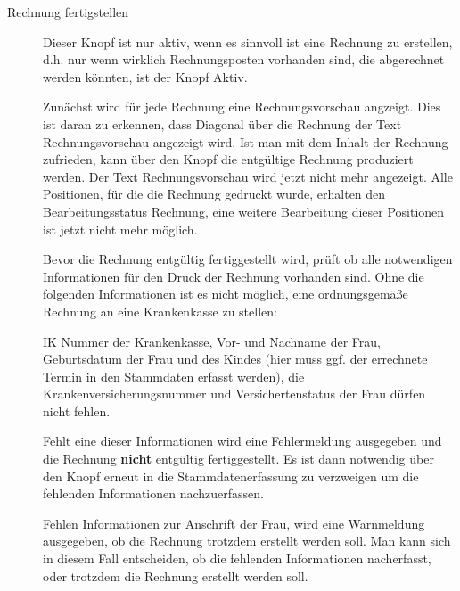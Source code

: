 \begin{description}
\item[Rechnung fertigstellen]
Dieser Knopf ist nur aktiv, wenn es sinnvoll ist eine Rechnung zu erstellen,
d.h. nur wenn wirklich Rechnungsposten vorhanden sind, die abgerechnet
werden könnten, ist der Knopf Aktiv.

Zunächst wird für jede Rechnung eine Rechnungsvorschau angzeigt. Dies
ist daran zu erkennen, dass Diagonal über die Rechnung der Text
Rechnungsvorschau angezeigt wird. Ist man mit dem Inhalt der Rechnung
zufrieden, kann über den Knopf  die
entgültige Rechnung produziert werden. Der Text Rechnungsvorschau
wird jetzt nicht mehr angezeigt. Alle Positionen, für die die
Rechnung gedruckt wurde, erhalten den Bearbeitungsstatus Rechnung,
eine weitere Bearbeitung dieser Positionen ist jetzt nicht mehr
möglich.\marginline{\Huge\bfseries!}%

Bevor die Rechnung entgültig fertiggestellt wird, prüft \tinyHeb\/ ob 
alle notwendigen Informationen für den Druck der Rechnung vorhanden sind.
Ohne die folgenden Informationen ist es nicht möglich, eine 
ordnungsgemäße Rechnung an eine Krankenkasse zu stellen:

IK Nummer der Krankenkasse, Vor- und Nachname der Frau, Geburtsdatum der
Frau und des Kindes (hier muss ggf. der errechnete Termin in den Stammdaten
erfasst werden), die Krankenversicherungsnummer und 
Versichertenstatus der Frau dürfen nicht fehlen.

Fehlt eine dieser Informationen wird eine Fehlermeldung ausgegeben und die
Rechnung \textbf{nicht} entgültig fertiggestellt. Es ist dann notwendig
über den Knopf  erneut in die Stammdatenerfassung zu 
verzweigen um die fehlenden Informationen nachzuerfassen.

Fehlen Informationen zur Anschrift der Frau, wird eine Warnmeldung ausgegeben,
ob die Rechnung trotzdem erstellt werden soll. Man kann sich in diesem 
Fall entscheiden, ob die fehlenden Informationen nacherfasst,
oder trotzdem die Rechnung erstellt werden soll.


\end{description}
